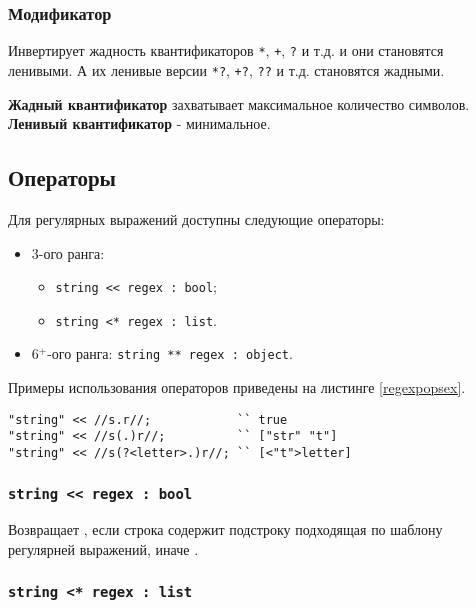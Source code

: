 \documentclass[a4paper, 14pt]{extarticle}
\newenvironment{icItems}
	{ \begin{itemize} [noitemsep,nolistsep] }
	{ \end{itemize} }
\begin{document}
\subsubsection{Модификатор }

Инвертирует жадность квантификаторов \lstinline|*|, \lstinline|+|, \lstinline|?| и т.д. и они становятся ленивыми. А их ленивые версии \lstinline|*?|, \lstinline|+?|, \lstinline|??| и т.д. становятся жадными.

{\bf Жадный квантификатор} захватывает максимальное количество символов. {\bf Ленивый квантификатор} - минимальное.

\subsection{Операторы}

Для регулярных выражений доступны следующие операторы:
\begin{icItems}
\item
	3-ого ранга:
	\begin{icItems}
	\item
		\lstinline|string << regex : bool|;
	\item
		\lstinline|string <* regex : list|.
	\end{icItems}

\item 
	6$^+$-ого ранга: \lstinline|string ** regex : object|.
\end{icItems}

Примеры использования операторов приведены на листинге \ref{regexpopsex}.

\begin{lstlisting}[caption=Операторы регулярных выражений, label=regexpopsex]
"string" << //s.r//;            `` true
"string" << //s(.)r//;          `` ["str" "t"]
"string" << //s(?<letter>.)r//; `` [<"t">letter]
\end{lstlisting}

\subsubsection{\lstinline|string << regex : bool|}

Возвращает \true{}, если строка содержит подстроку подходящая по шаблону регулярней выражений, иначе \false{}.

\subsubsection{\lstinline|string <* regex : list|}
\end{document}
